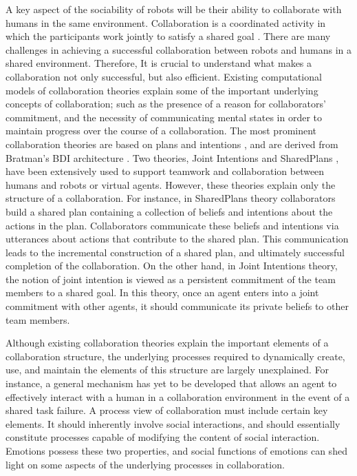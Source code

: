 A key aspect of the sociability of robots will be their ability to collaborate
with humans in the same environment. Collaboration is a coordinated activity in
which the participants work jointly to satisfy a shared goal
\cite{grosz:plans-discourse}. There are many challenges in achieving a
successful collaboration between robots and humans in a shared environment.
Therefore, It is crucial to understand what makes a collaboration not only
successful, but also efficient. Existing computational models of collaboration
theories explain some of the important underlying concepts of collaboration;
such as the presence of a reason for collaborators' commitment, and the necessity
of communicating mental states in order to maintain progress over the course of
a collaboration. The most prominent collaboration theories are based on plans
and intentions \cite{cohen:teamwork} \cite{grosz:plans-discourse}
\cite{Litman:discourse-commonsense}, and are derived from Bratman's BDI
architecture \cite{bratman:intentions-plans}. Two theories, Joint Intentions
\cite{cohen:teamwork} and SharedPlans
\cite{grosz:planning-acting,grosz:collaboration,grosz:plans-discourse}, have
been extensively used to support teamwork and collaboration between humans and
robots or virtual agents. However, these theories explain only the structure of
a collaboration. For instance, in SharedPlans theory collaborators build a
shared plan containing a collection of beliefs and intentions about the actions
in the plan. Collaborators communicate these beliefs and intentions via
utterances about actions that contribute to the shared plan. This communication
leads to the incremental construction of a shared plan, and ultimately
successful completion of the collaboration. On the other hand, in Joint
Intentions theory, the notion of joint intention is viewed as a persistent
commitment of the team members to a shared goal. In this theory, once an agent
enters into a joint commitment with other agents, it should communicate its
private beliefs to other team members.

Although existing collaboration theories explain the important elements of a
collaboration structure, the underlying processes required to dynamically
create, use, and maintain the elements of this structure are largely
unexplained. For instance, a general mechanism has yet to be developed that
allows an agent to effectively interact with a human in a collaboration
environment in the event of a shared task failure. A process view of
collaboration must include certain key elements. It should inherently involve
social interactions, and should essentially constitute processes capable of
modifying the content of social interaction. Emotions possess these
two properties, and social functions of emotions can shed light on some aspects
of the underlying processes in collaboration.

